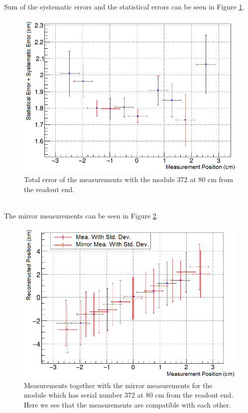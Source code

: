 \documentclass[a4paper]{article}\linespread{1.4}
\begin{document}
Sum of the systematic errors and the statistical errors can be seen in Figure \ref{fig:72e}.
\begin{figure}[h!] \hspace*{-0cm} \includegraphics[width=120mm,scale=2.0]{figures/72e.png} \caption{Total error of the measurements with the module 372 at 80 cm from the readout end.}  \label{fig:72e}\end{figure}
\\The mirror measurements can be seen in Figure \ref{fig:72mir}.
\begin{figure}[h!] \hspace*{-0cm} \includegraphics[width=120mm,scale=2.0]{figures/72mir.png} \caption{Measurements together with the mirror measurements for the module which has serial number 372 at 80 cm from the readout end. Here we see that the measurements are compatible with each other.}  \label{fig:72mir}\end{figure}
\end{document}
